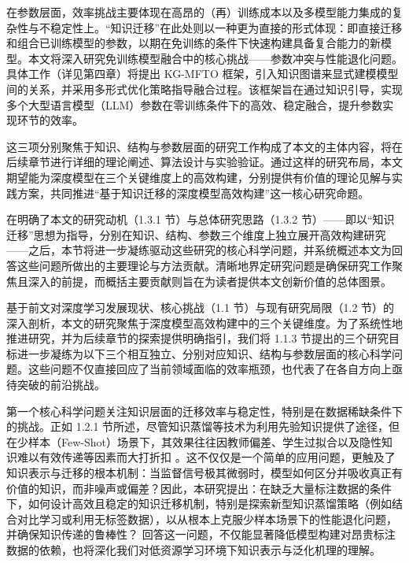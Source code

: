 \documentclass[../main.tex]{subfiles}
\begin{document}
在参数层面，效率挑战主要体现在高昂的（再）训练成本以及多模型能力集成的复杂性与不稳定性上。“知识迁移”在此处则以一种更为直接的形式体现：即直接迁移和组合已训练模型的参数，以期在免训练的条件下快速构建具备复合能力的新模型。本文将深入研究免训练模型融合中的核心挑战——参数冲突与性能退化问题。具体工作（详见第四章）将提出 KG-MFTO 框架，引入知识图谱来显式建模模型间的关系，并采用多形式优化策略指导融合过程。该框架旨在通过知识引导，实现多个大型语言模型（LLM）参数在零训练条件下的高效、稳定融合，提升参数实现环节的效率。

这三项分别聚焦于知识、结构与参数层面的研究工作构成了本文的主体内容，将在后续章节进行详细的理论阐述、算法设计与实验验证。通过这样的研究布局，本文期望能为深度模型在三个关键维度上的高效构建，分别提供有价值的理论见解与实践方案，共同推进“基于知识迁移的深度模型高效构建”这一核心研究命题。

\label{sec:research-questions-and-contributions}

在明确了本文的研究动机（1.3.1 节）与总体研究思路（1.3.2 节）——即以“知识迁移”思想为指导，分别在知识、结构、参数三个维度上独立展开高效构建研究——之后，本节将进一步凝练驱动这些研究的核心科学问题，并系统概述本文为回答这些问题所做出的主要理论与方法贡献。清晰地界定研究问题是确保研究工作聚焦且深入的前提，而概括主要贡献则旨在为读者提供本文创新价值的总体图景。


基于前文对深度学习发展现状、核心挑战（1.1 节）与现有研究局限（1.2 节）的深入剖析，本文的研究聚焦于深度模型高效构建中的三个关键维度。为了系统性地推进研究，并为后续章节的探索提供明确指引，我们将 1.1.3 节提出的三个研究目标进一步凝练为以下三个相互独立、分别对应知识、结构与参数层面的核心科学问题。这些问题不仅直接回应了当前领域面临的效率瓶颈，也代表了在各自方向上亟待突破的前沿挑战。

第一个核心科学问题关注知识层面的迁移效率与稳定性，特别是在数据稀缺条件下的挑战。正如 1.2.1 节所述，尽管知识蒸馏等技术为利用先验知识提供了途径，但在少样本（Few-Shot）场景下，其效果往往因教师偏差、学生过拟合以及隐性知识难以有效传递等因素而大打折扣 。这不仅仅是一个简单的应用问题，更触及了知识表示与迁移的根本机制：当监督信号极其微弱时，模型如何区分并吸收真正有价值的知识，而非噪声或偏差？因此，本研究提出：在缺乏大量标注数据的条件下，如何设计高效且稳定的知识迁移机制，特别是探索新型知识蒸馏策略（例如结合对比学习或利用无标签数据），以从根本上克服少样本场景下的性能退化问题，并确保知识传递的鲁棒性？ 回答这一问题，不仅能显著降低模型构建对昂贵标注数据的依赖，也将深化我们对低资源学习环境下知识表示与泛化机理的理解。
\end{document}
